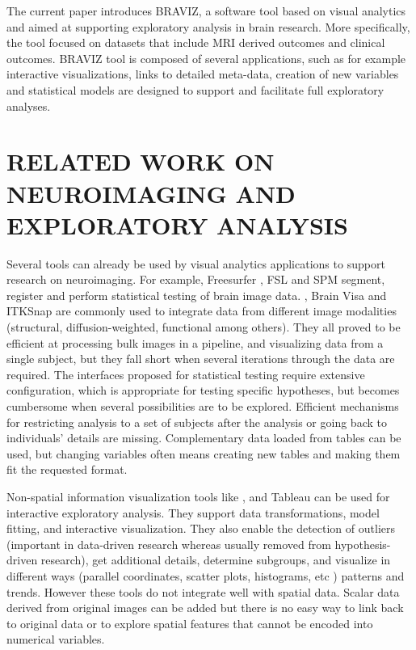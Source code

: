 \documentclass[utf8,paper]{frontiersSCNS} %
\begin{document}
The current paper introduces BRAVIZ, a software tool based on visual analytics and aimed at supporting exploratory analysis in brain research. More specifically, the tool focused on datasets that include MRI derived outcomes and clinical outcomes. BRAVIZ tool is composed of several applications, such as for example interactive visualizations, links to detailed meta-data, creation of new variables and statistical models are designed to support and facilitate full exploratory analyses.  

\section{RELATED WORK ON NEUROIMAGING AND EXPLORATORY ANALYSIS }


Several tools can already be used by visual analytics applications to support research on neuroimaging. For example, Freesurfer \citep{fischl_freesurfer_2012}, FSL \citep{jenkinson_fsl_2012} and SPM \citep{friston_statistical_2006} segment, register and perform statistical testing of brain image data. \citep{fedorov_3d_2012}, Brain Visa \citep{cointepas_brainvisa:_2001} and ITKSnap \citep{yushkevich_user-guided_2006} are commonly used to integrate data from different image modalities (structural, diffusion-weighted, functional among others). They all proved to be efficient at processing bulk images in a pipeline, and visualizing data from a single subject, but they fall short when several iterations through the data are required. The interfaces proposed for statistical testing require extensive configuration, which is appropriate for testing specific hypotheses, but becomes cumbersome when several possibilities are to be explored. Efficient mechanisms for restricting analysis to a set of subjects after the analysis or going back to individuals’ details are missing. Complementary data loaded from tables can be used, but changing variables often means creating new tables and making them fit the requested format.


Non-spatial information visualization tools like \citep{cook_interactive_2007}, and Tableau\citep{hanrahan_tableau_2003} can be used for interactive exploratory analysis. They support data transformations, model fitting, and interactive visualization. They also enable the detection of outliers (important in data-driven research whereas usually removed from hypothesis-driven research), get additional details, determine subgroups, and visualize in different ways (parallel coordinates, scatter plots, histograms, etc ) patterns and trends. However these tools do not integrate well with spatial data. Scalar data derived from original images can be added but there is no easy way to link back to original data or to explore spatial features that cannot be encoded into numerical variables.
\end{document}
